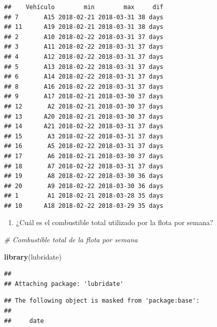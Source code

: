 \documentclass[]{article}
\newenvironment{Shaded}{\begin{snugshade}}{\end{snugshade}}
\newcommand{\KeywordTok}[1]{\textcolor[rgb]{0.13,0.29,0.53}{\textbf{#1}}}
\newcommand{\CommentTok}[1]{\textcolor[rgb]{0.56,0.35,0.01}{\textit{#1}}}
\newcommand{\NormalTok}[1]{#1}
\providecommand{\tightlist}{%
  \setlength{\itemsep}{0pt}\setlength{\parskip}{0pt}}
\begin{document}
\begin{verbatim}
##    Vehículo        min        max     dif
## 7       A15 2018-02-21 2018-03-31 38 days
## 11      A19 2018-02-21 2018-03-31 38 days
## 2       A10 2018-02-22 2018-03-31 37 days
## 3       A11 2018-02-22 2018-03-31 37 days
## 4       A12 2018-02-22 2018-03-31 37 days
## 5       A13 2018-02-22 2018-03-31 37 days
## 6       A14 2018-02-22 2018-03-31 37 days
## 8       A16 2018-02-22 2018-03-31 37 days
## 9       A17 2018-02-21 2018-03-30 37 days
## 12       A2 2018-02-21 2018-03-30 37 days
## 13      A20 2018-02-21 2018-03-30 37 days
## 14      A21 2018-02-22 2018-03-31 37 days
## 15       A3 2018-02-22 2018-03-31 37 days
## 16       A5 2018-02-22 2018-03-31 37 days
## 17       A6 2018-02-21 2018-03-30 37 days
## 18       A7 2018-02-22 2018-03-31 37 days
## 19       A8 2018-02-22 2018-03-30 36 days
## 20       A9 2018-02-22 2018-03-30 36 days
## 1        A1 2018-02-21 2018-03-28 35 days
## 10      A18 2018-02-22 2018-03-29 35 days
\end{verbatim}

\begin{enumerate}
\def\labelenumi{\alph{enumi}.}
\setcounter{enumi}{2}
\tightlist
\item
  ¿Cuál es el combustible total utilizado por la flota por semana?
\end{enumerate}

\begin{Shaded}
\begin{Highlighting}[]
\CommentTok{# Combustible total de la flota por semana}

\KeywordTok{library}\NormalTok{(lubridate)}
\end{Highlighting}
\end{Shaded}

\begin{verbatim}
## 
## Attaching package: 'lubridate'
\end{verbatim}

\begin{verbatim}
## The following object is masked from 'package:base':
## 
##     date
\end{verbatim}
\end{document}
